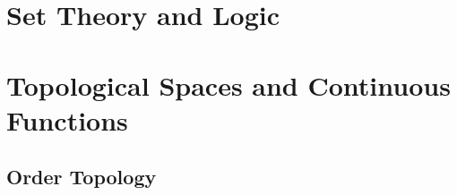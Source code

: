 \documentclass[oneside]{book}
\begin{document}
\chapter{Set Theory and Logic}

\chapter{Topological Spaces and Continuous Functions}




\section{Order Topology}





\end{document}
